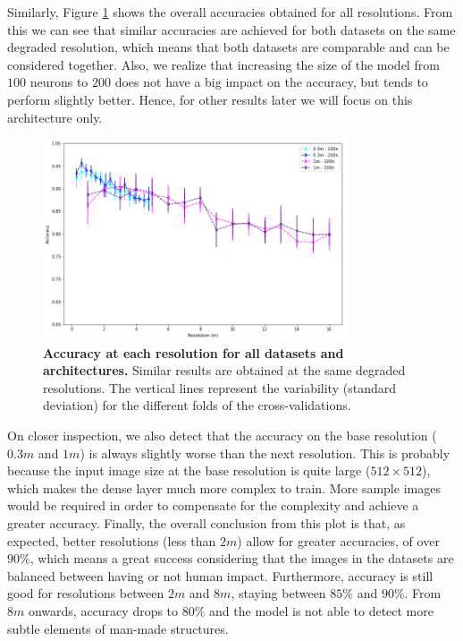 Similarly, Figure \ref{fig:acc_res_03m_1m} shows the overall accuracies obtained for all resolutions. From this we can see that similar accuracies are achieved for both datasets on the same degraded resolution, which means that both datasets are comparable and can be considered together. Also, we realize that increasing the size of the model from $100$ neurons to $200$ does not have a big impact on the accuracy, but tends to perform slightly better. Hence, for other results later we will focus on this architecture only.

\begin{figure}[h!]
	\centering
	\includegraphics[width=0.8\textwidth]{Figures/results/acc_res_03m_1m.png}
	\captionsetup{width=1\linewidth}
	\caption{\textbf{Accuracy at each resolution for all datasets and architectures.} Similar results are obtained at the same degraded resolutions. The vertical lines represent the variability (standard deviation) for the different folds of the cross-validations.}
	\label{fig:acc_res_03m_1m}
\end{figure}

On closer inspection, we also detect that the accuracy on the base resolution ($0.3m$ and $1m$) is always slightly worse than the next resolution. This is probably because the input image size at the base resolution is quite large ($512\times512$), which makes the dense layer much more complex to train. More sample images would be required in order to compensate for the complexity and achieve a greater accuracy. Finally, the overall conclusion from this plot is that, as expected, better resolutions (less than $2m$) allow for greater accuracies, of over $90\%$, which means a great success considering that the images in the datasets are balanced between having or not human impact. Furthermore, accuracy is still good for resolutions between $2m$ and $8m$, staying between $85\%$ and $90\%$. From $8m$ onwards, accuracy drops to $80\%$ and the model is not able to detect more subtle elements of man-made structures.

